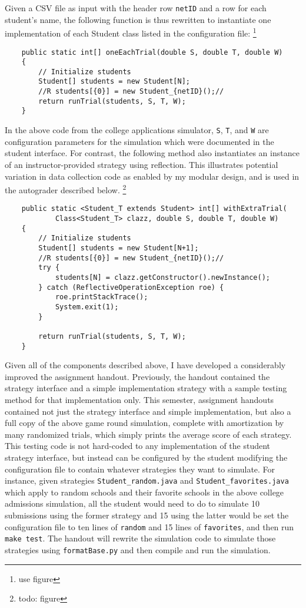 \documentclass[pageno]{jpaper}
\begin{document}
Given a CSV file as input with the header row \texttt{netID} and a row for each student's name, the following function is thus rewritten to instantiate one implementation of each Student class listed in the configuration file:
\footnote{use figure}
\begin{verbatim}
    public static int[] oneEachTrial(double S, double T, double W)
    {
        // Initialize students
        Student[] students = new Student[N];
        //R students[{0}] = new Student_{netID}();//
        return runTrial(students, S, T, W);
    }
\end{verbatim}
In the above code from the college applications simulator, \texttt{S}, \texttt{T}, and \texttt{W} are configuration parameters for the simulation which were documented in the student interface.
For contrast, the following method also instantiates an instance of an instructor-provided strategy using reflection.
This illustrates potential variation in data collection code as enabled by my modular design, and is used in the autograder described below.
\footnote{todo: figure}
\begin{verbatim}
    public static <Student_T extends Student> int[] withExtraTrial(
            Class<Student_T> clazz, double S, double T, double W)
    {
        // Initialize students
        Student[] students = new Student[N+1];
        //R students[{0}] = new Student_{netID}();//
        try {
            students[N] = clazz.getConstructor().newInstance();
        } catch (ReflectiveOperationException roe) {
            roe.printStackTrace();
            System.exit(1);
        }

        return runTrial(students, S, T, W);
    }
\end{verbatim}

Given all of the components described above, I have developed a considerably improved the assignment handout.
Previously, the handout contained the strategy interface and a simple implementation strategy with a sample testing method for that implementation only.
This semester, assignment handouts contained not just the strategy interface and simple implementation, but also a full copy of the above game round simulation, complete with amortization by many randomized trials, which simply prints the average score of each strategy.
This testing code is not hard-coded to any implementation of the student strategy interface, but instead can be configured by the student modifying the configuration file to contain whatever strategies they want to simulate.
For instance, given strategies \texttt{Student\_random.java} and \texttt{Student\_favorites.java} which apply to random schools and their favorite schools in the above college admissions simulation, all the student would need to do to simulate 10 submissions using the former strategy and 15 using the latter would be set the configuration file to ten lines of \texttt{random} and 15 lines of \texttt{favorites}, and then run \texttt{make test}.
The handout will rewrite the simulation code to simulate those strategies using \texttt{formatBase.py} and then compile and run the simulation.
\end{document}
